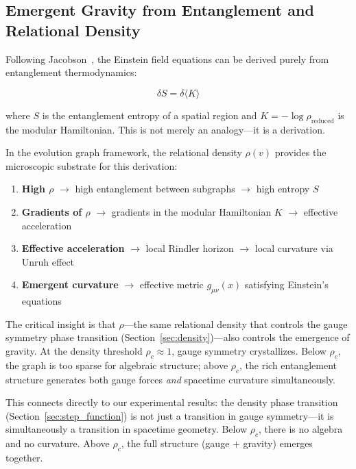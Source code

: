 \subsection{Emergent Gravity from Entanglement and Relational Density}\label{sec:gravity_entanglement}

Following Jacobson~\cite{Jacobson1995,Jacobson1998}, the Einstein field equations can be derived purely from entanglement thermodynamics:

\begin{equation}
\delta S = \delta\langle K \rangle
\end{equation}

where $S$ is the entanglement entropy of a spatial region and $K = -\log \rho_{\mathrm{reduced}}$ is the modular Hamiltonian. This is not merely an analogy---it is a derivation.

In the evolution graph framework, the relational density $\rho(v)$ provides the microscopic substrate for this derivation:

\begin{enumerate}
\item \textbf{High $\rho$} $\to$ high entanglement between subgraphs $\to$ high entropy $S$
\item \textbf{Gradients of $\rho$} $\to$ gradients in the modular Hamiltonian $K$ $\to$ effective acceleration
\item \textbf{Effective acceleration} $\to$ local Rindler horizon $\to$ local curvature via Unruh effect
\item \textbf{Emergent curvature} $\to$ effective metric $g_{\mu\nu}(x)$ satisfying Einstein's equations
\end{enumerate}

The critical insight is that $\rho$---the same relational density that controls the gauge symmetry phase transition (Section~\ref{sec:density})---also controls the emergence of gravity. At the density threshold $\rho_c \approx 1$, gauge symmetry crystallizes. Below $\rho_c$, the graph is too sparse for algebraic structure; above $\rho_c$, the rich entanglement structure generates both gauge forces \textit{and} spacetime curvature simultaneously.

This connects directly to our experimental results: the density phase transition (Section~\ref{sec:step_function}) is not just a transition in gauge symmetry---it is simultaneously a transition in spacetime geometry. Below $\rho_c$, there is no algebra and no curvature. Above $\rho_c$, the full structure (gauge $+$ gravity) emerges together.

